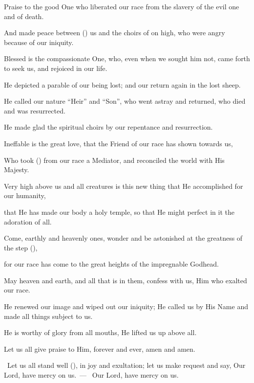 \documentclass[12pt,twoside,a5paper]{article}
\begin{document}
\begin{halfparskip}
  Praise to the good One who liberated our race from the slavery of the evil one and of death.

  And made peace between () us and the choirs of on high, who were angry because of our iniquity.

  Blessed is the compassionate One, who, even when we sought him not, came forth to seek us, and rejoiced in our life.

  He depicted a parable of our being lost; and our return again in the lost sheep.

  He called our nature ``Heir'' and ``Son'', who went astray and returned, who died and was resurrected.

  He made glad the spiritual choirs by our repentance and resurrection.

  Ineffable is the great love, that the Friend of our race has shown towards us,

  Who took () from our race a Mediator, and reconciled the world with His Majesty.

  Very high above us and all creatures is this new thing that He accomplished for our humanity,

  that He has made our body a holy temple, so that He might perfect in it the adoration of all.

  Come, earthly and heavenly ones, wonder and be astonished at the greatness of the step (),

  for our race has come to the great heights of the impregnable Godhead.

  May heaven and earth, and all that is in them, confess with us, Him who exalted our race.

  He renewed our image and wiped out our iniquity; He called us by His Name and made all things subject to us.

  He is worthy of glory from all mouths, He lifted us up above all.

  Let us all give praise to Him, forever and ever, amen and amen.
\end{halfparskip}




\dd~Let us all stand well (), in joy and exultation; let us make request and say, Our Lord, have mercy on us.~--- \rr~Our Lord, have mercy on us. 
\end{document}
